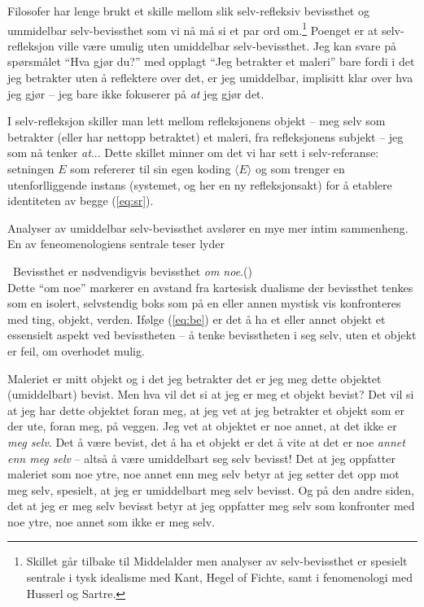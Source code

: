 \documentclass[10pt,twocolumn]{article}
\newcounter{EQ}
\newcommand{\equ}[1]{\refstepcounter{EQ}\vspace{.5ex}\par\noindent\ 
    \hfill #1\hfill{(\theEQ)}\\[.5ex]}
\newcommand{\refp}[1]{(\ref{#1})}
\newcommand{\<}{\langle}
\renewcommand{\>}{\rangle}
\begin{document}
Filosofer har lenge brukt et skille mellom slik selv-refleksiv bevissthet 
og ummidelbar selv-bevissthet som vi n{\aa} m{\aa} si et par ord 
om.\footnote{Skillet g{\aa}r tilbake til Middelalder men 
analyser av selv-bevissthet er spesielt sentrale i tysk 
idealisme med Kant, Hegel of Fichte, samt i fenomenologi 
med Husserl og Sartre.} Poenget er at selv-refleksjon ville v{\ae}re umulig uten 
umiddelbar selv-bevissthet. Jeg kan svare p{\aa} sp{\o}rsm{\aa}let ``Hva 
gj{\o}r du?'' med opplagt ``Jeg betrakter et maleri'' bare fordi i det jeg 
betrakter uten {\aa} reflektere over det, er jeg umiddelbar, implisitt klar over hva 
jeg gj{\o}r -- jeg bare ikke fokuserer p{\aa} {\em at} jeg gj{\o}r det.

I selv-refleksjon skiller man lett mellom refleksjonens objekt -- 
meg selv som betrakter (eller har nettopp betraktet) et maleri, fra refleksjonens
subjekt -- jeg som n{\aa} tenker {\em at}... Dette skillet minner
om det vi har sett i selv-referanse: setningen $E$ som refererer til 
sin egen koding $\<E\>$ og som trenger en utenforlliggende instans (systemet, og her 
en ny refleksjonsakt) for {\aa} etablere identiteten av begge \refp{eq:sr}.
 
Analyser av umiddelbar selv-bevissthet 
avsl{\o}rer en mye mer intim sammenheng. En av feneomenologiens sentrale 
teser lyder 
\equ{Bevissthet er n{\o}dvendigvis bevissthet {\em om noe}.}\label{eq:be}
Dette ``om noe'' markerer en avstand fra kartesisk dualisme der 
bevissthet tenkes som en isolert, selvstendig boks som p{\aa} en eller 
annen mystisk vis konfronteres med ting, objekt, verden. If{\o}lge 
\refp{eq:be} er det {\aa} ha et eller annet objekt et essensielt aspekt 
ved bevisstheten -- {\aa} tenke bevisstheten i seg selv, uten et objekt er 
feil, om overhodet mulig.

Maleriet er mitt objekt og i det jeg betrakter det er jeg meg dette 
objektet (umiddelbart) bevist. Men hva vil det si at jeg er meg et objekt 
bevist? Det vil si at jeg har dette objektet foran meg, at jeg vet at jeg 
betrakter et objekt som er der ute, foran meg, p{\aa} veggen. 
Jeg vet at objektet er noe annet, at det ikke er {\em meg selv}.
Det {\aa} v{\ae}re bevist, det {\aa} ha et objekt er det {\aa} vite 
at det er noe {\em annet enn meg selv} -- alts{\aa} {\aa} v{\ae}re umiddelbart 
seg selv bevisst! 
Det at jeg oppfatter maleriet som noe ytre, noe annet enn meg selv betyr
at jeg setter det opp mot meg selv, spesielt, at jeg er umiddelbart 
meg selv bevisst. Og p{\aa} den andre siden, det at jeg er meg selv bevisst 
betyr at jeg oppfatter meg selv som konfronter med noe 
ytre, noe annet som ikke er meg selv.
\end{document}
